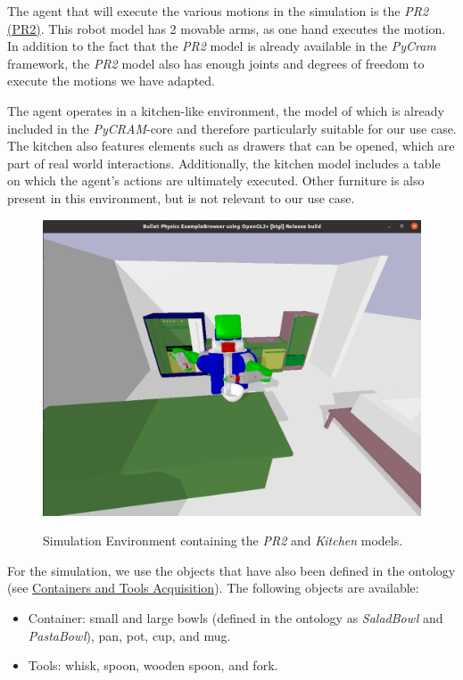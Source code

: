 The agent that will execute the various motions in the simulation is the  \textit{PR2} \hyperref[sec:pr2]{(PR2)}.
This robot model has 2 movable arms, as one hand executes the motion. In addition to the fact that the \textit{PR2} model is already available in the \textit{PyCram} framework,
the \textit{PR2} model also has enough joints and degrees of freedom to execute the motions we have adapted.

The agent operates in a kitchen-like environment, the model of which is already included in the \textit{PyCRAM}-core and therefore particularly suitable for our use case. The kitchen also features elements such as drawers that can be opened, which are part of real world interactions. Additionally, the kitchen model includes a table on which the agent's actions are ultimately executed. Other furniture is also present in this environment, but is not relevant to our use case.

\begin{figure}[H]
    \includegraphics[scale=0.35]{Graphics/bulletworldexample.png}
    \label{fig:bulletworldexample}
    \caption{Simulation Environment containing the \textit{PR2} and \textit{Kitchen} models. }
\end{figure}

For the simulation, we use the objects that have also been defined in the ontology (see \hyperref[sec:ContainersAndToolsAcquisition]{Containers and Tools Acquisition}).
The following objects are available:
\begin{itemize}
	\item Container: small and large bowls (defined in the ontology as \textit{SaladBowl} and \textit{PastaBowl}), pan, pot, cup, and mug.
	\item Tools: whisk, spoon, wooden spoon, and fork.
\end{itemize}

